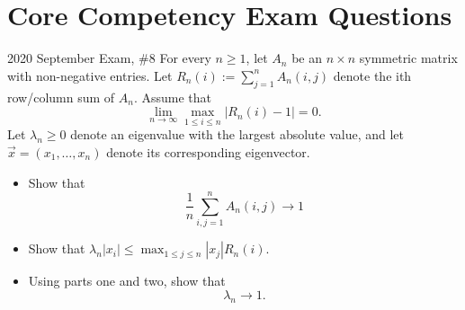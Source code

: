 \documentclass[../main]{subfiles}
\begin{document}
\section{Core Competency Exam Questions}
\begin{bbox}{{2020 September Exam, \#8}}
    For every $n\geq 1$, let $A_n$ be an $n\times n$ symmetric matrix with non-negative entries. Let $R_n(i):= \sum_{j=1}^n A_n(i,j)$ denote the ith row/column sum of $A_n$. Assume that 
    \[
    \lim_{n\to \infty} \max_{1\leq i \leq n} |R_n(i) - 1| = 0.
    \]
    Let $\lambda_n \geq 0$ denote an eigenvalue with the largest absolute value, and let $\vec x = (x_1, \dots, x_n)$ denote its corresponding eigenvector. 
    \begin{itemize}
        \item Show that 
        \[
        \frac{1}{n} \sum_{i,j=1}^n A_n(i,j) \to 1
        \]
        \item Show that $\lambda_n |x_i| \leq \max_{1\leq j \leq n} |x_j| R_n(i)$.
        \item Using parts one and two, show that 
        \[
        \lambda_n \to 1.
        \]
    \end{itemize}
\end{bbox}
\end{document}
